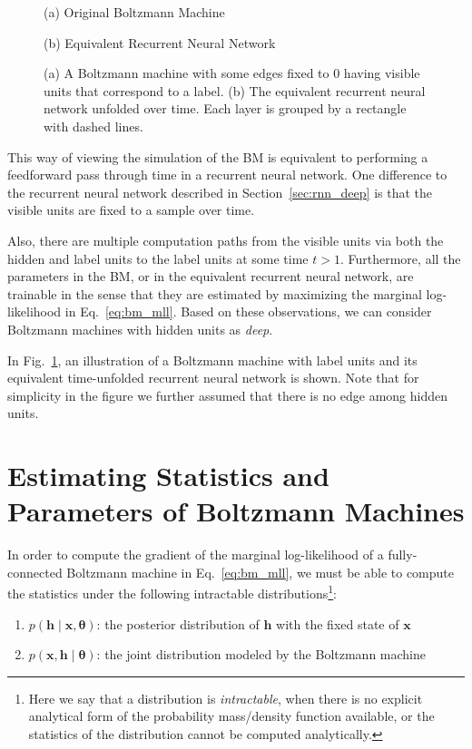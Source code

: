 \documentclass[dissertation,nocontribution]{aaltoseries}
\newcommand{\vect}[1]{\mathbf{#1}}
\newcommand{\vects}[1]{\boldsymbol{#1}}
\newcommand{\vh}[0]{\vect{h}}
\newcommand{\vx}[0]{\vect{x}}
\newcommand{\TT}[0]{{\vects{\theta}}}
\begin{document}
\begin{figure}[t]
    \vspace{2mm}
    \begin{minipage}{0.48\textwidth}
        \centering
        \small
        (a) Original Boltzmann Machine
    \end{minipage}
    \begin{minipage}{0.48\textwidth}
        \centering
        \small
        (b) Equivalent Recurrent Neural Network
    \end{minipage}
    \caption{(a) A Boltzmann machine with some edges fixed
    to $0$ having visible units that correspond to a label.
    (b) The equivalent recurrent neural network unfolded over
    time. Each layer is grouped by a rectangle with dashed
    lines.}
    \label{fig:bm_rnn}
\end{figure}

This way of viewing the simulation of the BM is equivalent to
performing a feedforward pass through time in a recurrent neural
network. One difference to the recurrent neural network described
in Section~\ref{sec:rnn_deep} is that the visible units are fixed
to a sample over time. 

Also, 
there are multiple computation
paths from the visible units via both the hidden and label
units to the label units at some time $t > 1$. Furthermore,
all the parameters in the BM, or in the equivalent recurrent
neural network, are trainable in the sense that they are
estimated by maximizing the marginal log-likelihood in
Eq.~\eqref{eq:bm_mll}. Based on these observations, we
can consider Boltzmann machines with hidden units
as \textit{deep}.

In Fig.~\ref{fig:bm_rnn}, an illustration of a Boltzmann
machine with label units and its equivalent time-unfolded
recurrent neural network is shown. Note that for
simplicity in the figure we further assumed that there is
no edge among hidden units.


\section{Estimating Statistics and Parameters of Boltzmann
Machines}
\label{sec:estimation_bm}

In order to compute the gradient of the marginal
log-likelihood of a fully-connected Boltzmann machine in
Eq.~\eqref{eq:bm_mll}, we must be able to compute the
statistics under the following intractable
distributions\footnote{Here we say that a distribution is
\textit{intractable}, when there is no explicit analytical
form of the probability mass/density function available, or
the statistics of the distribution cannot be computed
analytically.}:
\begin{enumerate}
    \itemsep 0em
    \item $p(\vh \mid \vx, \TT)$: the posterior distribution
        of $\vh$ with the fixed state of $\vx$
    \item $p(\vx, \vh \mid \TT)$: the joint distribution
        modeled by the Boltzmann machine
\end{enumerate}
\end{document}
